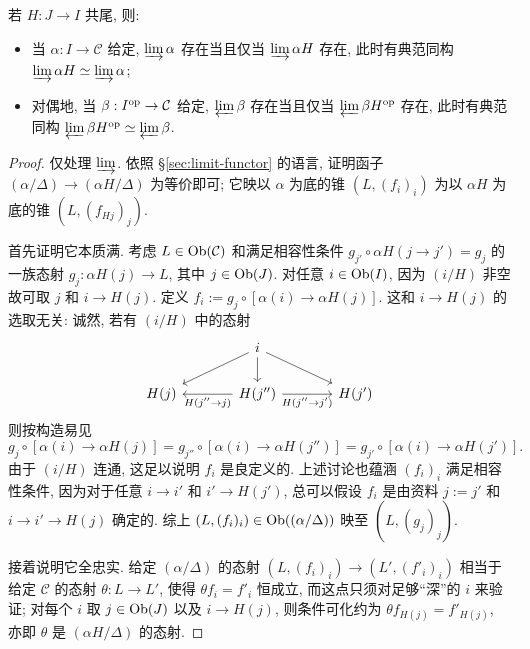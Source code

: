 \begin{proposition}\label{prop:cofinal-lim}
	若 $H: J \to I$ 共尾, 则:
	\begin{itemize}
		\item 当 $\alpha: I \to \mathcal{C}$ 给定, $\varinjlim \alpha$ 存在当且仅当 $\varinjlim \alpha H$ 存在, 此时有典范同构 $\varinjlim \alpha H \simeq \varinjlim \alpha$;
		\item 对偶地, 当 $\beta: I^{\operatorname{op}} \to \mathcal{C}$ 给定, $\varprojlim \beta$ 存在当且仅当 $\varprojlim \beta H^{\operatorname{op}}$ 存在, 此时有典范同构 $\varprojlim \beta H^{\operatorname{op}} \simeq \varprojlim \beta$.
	\end{itemize}
\end{proposition}
\begin{proof}
	仅处理 $\varinjlim$. 依照 \S\ref{sec:limit-functor} 的语言, 证明函子 $(\alpha/\Delta) \to (\alpha H / \Delta)$ 为等价即可; 它映以 $\alpha$ 为底的锥 $(L, (f_i)_i)$ 为以 $\alpha H$ 为底的锥 $(L, (f_{Hj})_j)$.

	首先证明它本质满. 考虑 $L \in \operatorname{Ob}(\mathcal{C})$ 和满足相容性条件 $g_{j'} \circ \alpha H(j \to j') = g_j$ 的一族态射 $g_j: \alpha H(j) \to L$, 其中 $j \in \operatorname{Ob}(J)$. 对任意 $i \in \operatorname{Ob}(I)$, 因为 $(i/H)$ 非空故可取 $j$ 和 $i \to H(j)$. 定义 $f_i := g_j \circ [\alpha(i) \to \alpha H(j)]$. 这和 $i \to H(j)$ 的选取无关: 诚然, 若有 $(i/H)$ 中的态射
	\[\begin{tikzcd}[column sep=large]
		& i \arrow[ld] \arrow[d] \arrow[rd] & \\
		H(j) & H(j'') \arrow[l, "{H(j'' \to j)}"] \arrow[r, "{H(j'' \to j')}"'] & H(j')
	\end{tikzcd}\]
	则按构造易见
	\[ g_j \circ [\alpha(i) \to \alpha H(j)] = g_{j''} \circ [\alpha(i) \to \alpha H(j'')] = g_{j'} \circ [\alpha(i) \to \alpha H(j')]. \]
	由于 $(i/H)$ 连通, 这足以说明 $f_i$ 是良定义的. 上述讨论也蕴涵 $(f_i)_i$ 满足相容性条件, 因为对于任意 $i \to i'$ 和 $i' \to H(j')$, 总可以假设 $f_i$ 是由资料 $j := j'$ 和 $i \to i' \to H(j)$ 确定的. 综上 $(L, (f_i)_i) \in \operatorname{Ob}((\alpha/\Delta))$ 映至 $(L, (g_j)_j)$.
	
	接着说明它全忠实. 给定 $(\alpha/\Delta)$ 的态射 $(L, (f_i)_i) \to (L', (f'_i)_i)$ 相当于给定 $\mathcal{C}$ 的态射 $\theta: L \to L'$, 使得 $\theta f_i = f'_i$ 恒成立, 而这点只须对足够``深''的 $i$ 来验证; 对每个 $i$ 取 $j \in \operatorname{Ob}(J)$ 以及 $i \to H(j)$, 则条件可化约为 $\theta f_{H(j)} = f'_{H(j)}$, 亦即 $\theta$ 是 $(\alpha H / \Delta)$ 的态射.
\end{proof}

